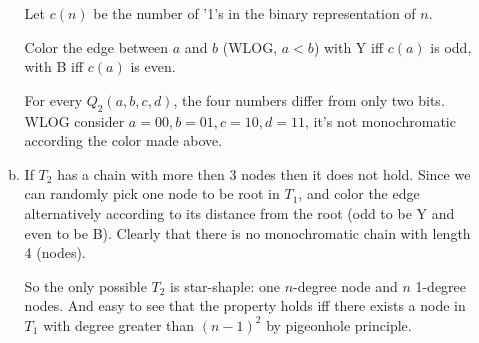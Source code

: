 \documentclass{article}
\begin{document}
\begin{itemize}
\begin{enumerate}[(a)]
                Let $c(n)$ be the number of '1's in the binary representation of $n$.

                Color the edge between $a$ and $b$ (WLOG, $a < b$) with Y iff $c(a)$ is odd, with B iff $c(a)$ is even.

                For every $Q_2(a, b, c, d)$, the four numbers differ from only two bits. WLOG consider
                $a = 00, b = 01, c = 10, d = 11$, it's not monochromatic according the color made above.

            \item
                If $T_2$ has a chain with more then 3 nodes then it does not hold.
                Since we can randomly pick one node to be root in $T_1$, and color the edge
                alternatively according to its distance from the root (odd to be Y and even to be B).
                Clearly that there is no monochromatic chain with length 4 (nodes).

                So the only possible $T_2$ is star-shaple: one $n$-degree node and $n$ 1-degree nodes.
                And easy to see that the property holds iff there exists a node in $T_1$ with degree
                greater than $(n - 1)^2$ by pigeonhole principle.

        \end{enumerate}

\end{itemize}
\end{document}
